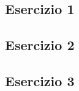 \subsection{\textbf{Esercizio 1}}
\vspace{0.5cm}

\vspace{1cm}
\subsection{\textbf{Esercizio 2}}
\vspace{0.5cm}

\vspace{1cm}
\subsection{\textbf{Esercizio 3}}
\vspace{0.5cm}

\vspace{1cm}
